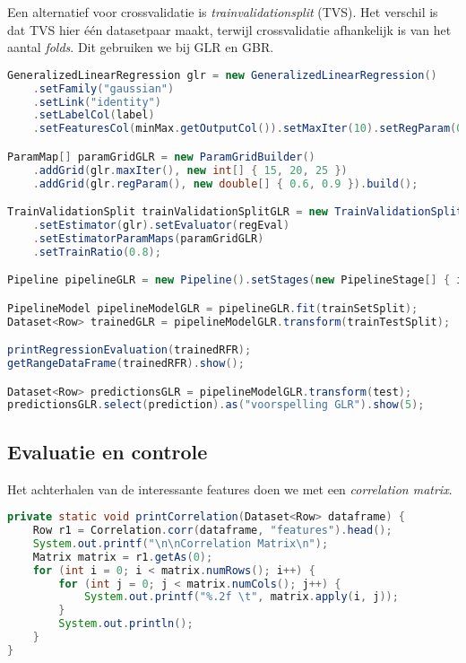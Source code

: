 \documentclass[a4paper,10pt,twoside]{report}
\begin{document}
Een alternatief voor crossvalidatie is \textit{trainvalidationsplit} (TVS). Het verschil is dat TVS hier één datasetpaar maakt, terwijl crossvalidatie afhankelijk is van het aantal \textit{folds}. Dit gebruiken we bij GLR en GBR.

\begin{lstlisting}[language=Java]
GeneralizedLinearRegression glr = new GeneralizedLinearRegression()
	.setFamily("gaussian")
	.setLink("identity")
	.setLabelCol(label)
	.setFeaturesCol(minMax.getOutputCol()).setMaxIter(10).setRegParam(0.3);

ParamMap[] paramGridGLR = new ParamGridBuilder()
	.addGrid(glr.maxIter(), new int[] { 15, 20, 25 })
	.addGrid(glr.regParam(), new double[] { 0.6, 0.9 }).build();

TrainValidationSplit trainValidationSplitGLR = new TrainValidationSplit()
	.setEstimator(glr).setEvaluator(regEval)
	.setEstimatorParamMaps(paramGridGLR)
	.setTrainRatio(0.8);

Pipeline pipelineGLR = new Pipeline().setStages(new PipelineStage[] { indexer, assembler, minMax, trainValidationSplitGLR});

PipelineModel pipelineModelGLR = pipelineGLR.fit(trainSetSplit);
Dataset<Row> trainedGLR = pipelineModelGLR.transform(trainTestSplit);

printRegressionEvaluation(trainedRFR);
getRangeDataFrame(trainedRFR).show();

Dataset<Row> predictionsGLR = pipelineModelGLR.transform(test);
predictionsGLR.select(prediction).as("voorspelling GLR").show(5);
\end{lstlisting}



\newpage

\subsection*{Evaluatie en controle}

Het achterhalen van de interessante features doen we met een \textit{correlation matrix}.

\begin{lstlisting}[language=Java]
private static void printCorrelation(Dataset<Row> dataframe) {
	Row r1 = Correlation.corr(dataframe, "features").head();
	System.out.printf("\n\nCorrelation Matrix\n");
	Matrix matrix = r1.getAs(0);
	for (int i = 0; i < matrix.numRows(); i++) {
		for (int j = 0; j < matrix.numCols(); j++) {
			System.out.printf("%.2f \t", matrix.apply(i, j));
		}
		System.out.println();
	}
}
\end{lstlisting}
\end{document}
